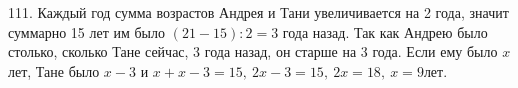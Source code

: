 111. Каждый год сумма возрастов Андрея и Тани увеличивается на 2 года, значит суммарно 15 лет им было $(21-15):2=3$ года назад. Так как Андрею было столько, сколько Тане сейчас, 3 года назад, он старше на 3 года. Если ему было $x$ лет, Тане было $x-3$ и $x+x-3=15,\ 2x-3=15,\ 2x=18,\ x=9$лет.\\
